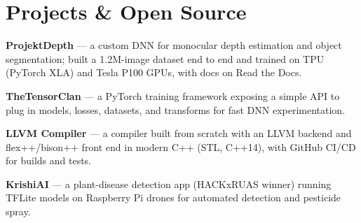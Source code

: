 \section{Projects \& Open Source}
\begin{points}
  \item \textbf{ProjektDepth} --- a custom DNN for monocular depth estimation and object segmentation; built a 1.2M-image dataset end to end and trained on TPU (PyTorch XLA) and Tesla P100 GPUs, with docs on Read the Docs.
  \item \textbf{TheTensorClan} --- a PyTorch training framework exposing a simple API to plug in models, losses, datasets, and transforms for fast DNN experimentation.
  \item \textbf{LLVM Compiler} --- a compiler built from scratch with an LLVM backend and flex++/bison++ front end in modern C++ (STL, C++14), with GitHub CI/CD for builds and tests.
  \item \textbf{KrishiAI} --- a plant-disease detection app (HACKxRUAS winner) running TFLite models on Raspberry Pi drones for automated detection and pesticide spray.
\end{points}
